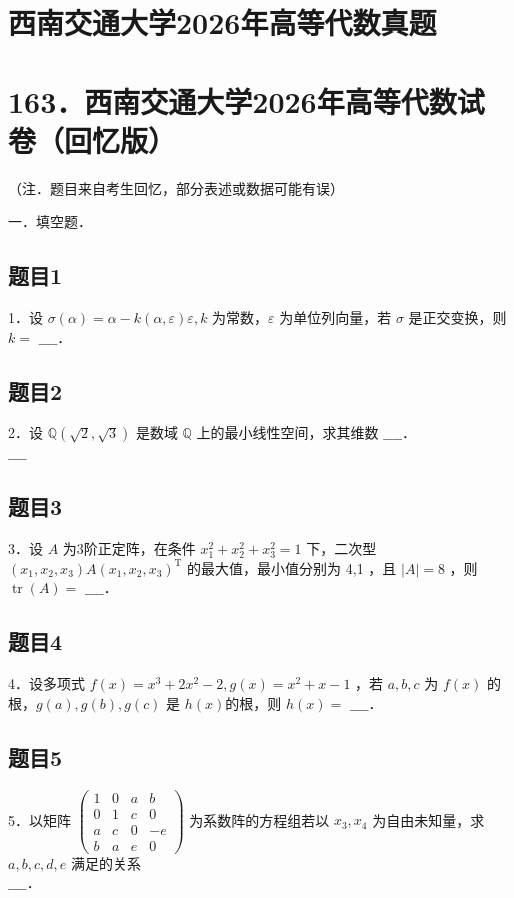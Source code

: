 \documentclass{article}
\begin{document}
\section*{西南交通大学2026年高等代数真题}
\section*{163．西南交通大学2026年高等代数试卷（回忆版）}
（注．题目来自考生回忆，部分表述或数据可能有误）

一．填空题．\\

\subsection{题目1}
1．设 \(\sigma(\alpha)=\alpha-k(\alpha, \varepsilon) \varepsilon, k\) 为常数，\(\varepsilon\) 为单位列向量，若 \(\sigma\) 是正交变换，则 \(k=\) \(\_\_\_\_\)．

\subsection{题目2}
2．设 \(\mathbb{Q}(\sqrt{2}, \sqrt{3})\) 是数域 \(\mathbb{Q}\) 上的最小线性空间，求其维数 \(\_\_\_\_\)．\\
\(\_\_\_\_\)

\subsection{题目3}
3．设 \(A\) 为3阶正定阵，在条件 \(x_{1}^{2}+x_{2}^{2}+x_{3}^{2}=1\) 下，二次型 \(\left(x_{1}, x_{2}, x_{3}\right) A\left(x_{1}, x_{2}, x_{3}\right)^{\mathrm{T}}\) 的最大值，最小值分别为 4,1 ，且 \(|A|=8\) ，则 \(\operatorname{tr}(A)=\) \(\_\_\_\_\)．

\subsection{题目4}
4．设多项式 \(f(x)=x^{3}+2 x^{2}-2, g(x)=x^{2}+x-1\) ，若 \(a, b, c\) 为 \(f(x)\) 的根，\(g(a), g(b), g(c)\) 是 \(h(x)\)的根，则 \(h(x)=\) \(\_\_\_\_\)．

\subsection{题目5}
5．以矩阵 \(\left(\begin{array}{cccc}1 & 0 & a & b \\ 0 & 1 & c & 0 \\ a & c & 0 & -e \\ b & a & e & 0\end{array}\right)\) 为系数阵的方程组若以 \(x_{3}, x_{4}\) 为自由未知量，求 \(a, b, c, d, e\) 满足的关系\\
\(\_\_\_\_\)．
\end{document}
